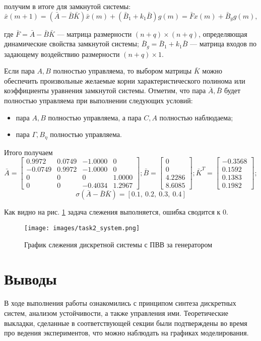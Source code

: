 \documentclass[a4paper, 14pt]{extarticle}
\theoremstyle{definition}
\theoremstyle{plain}
\theoremstyle{remark}
\begin{document}
получим в итоге для замкнутой системы:
\[
\bar{x}(m + 1) = (\bar{A} - \bar{B} \bar{K}) \bar{x}(m) + (\bar{B}_1 + k_1 \bar{B}) g(m) = \bar{F} x(m) + \bar{B}_g g(m),
\]

где \(\bar{F} = \bar{A} - \bar{B} \bar{K}\) — матрица размерности \((n + q) \times (n + q)\), определяющая динамические свойства замкнутой системы; \(\bar{B}_g = \bar{B}_1 + k_1 \bar{B}\) — матрица входов по задающему воздействию размерности \((n + q) \times 1\).

Если пара \(A, B\) полностью управляема, то выбором матрицы \(\bar{K}\) можно обеспечить произвольные желаемые корни характеристического полинома или коэффициенты уравнения замкнутой системы. Отметим, что пара \(\bar{A}, \bar{B}\) будет полностью управляема при выполнении следующих условий:

\begin{itemize}
    \item пара \(A, B\) полностью управляема, а пара \(C, A\) полностью наблюдаема;
    \item пара \(\Gamma, B_\eta\) полностью управляема.
\end{itemize}

Итого получаем
\[
\bar A =
	\begin{bmatrix}
	0.9972 & 0.0749 & -1.0000 & 0 \\
	-0.0749 & 0.9972 & -1.0000 & 0 \\
	0 & 0 & 0 & 1.0000 \\
	0 & 0 & -0.4034 & 1.2967
	\end{bmatrix};
\bar B = \begin{bmatrix}
	0 \\
	0 \\
	4.2286 \\
	8.6085
	\end{bmatrix};
\bar K^T = \begin{bmatrix}
	-0.3568 \\ 0.1592 \\ 0.1383 \\ 0.1982
	\end{bmatrix};
\]
\[\sigma(\bar{A} - \bar{B} \bar{K}) = [0.1,~0.2,~0.3,~0.4]\]

Как видно на рис. \ref{fig:task2_y} задача слежения выполняется, ошибка сводится к 0.
\begin{figure}
	[H]
	\centering
	\texttt{[image: images/task2\_system.png]}
	\caption{График слежения дискретной системы с ПВВ за генератором}
	\label{fig:task2_y}
\end{figure}
\newpage
\section{Выводы}
В ходе выполнения работы ознакомились с принципом синтеза дискретных систем, анализом устойчивости, а также управления ими. Теоретические выкладки, сделанные в соответствующей секции были подтверждены во время про ведения экспериментов, что можно наблюдать на графиках моделирования.
\end{document}
